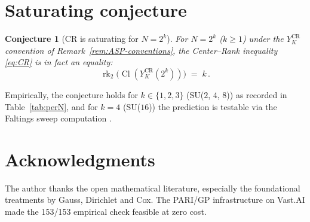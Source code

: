 \documentclass[11pt,a4paper,reqno]{amsart}
\newtheorem{conjecture}[theorem]{Conjecture}
\theoremstyle{definition}
\DeclareMathOperator{\Cl}{Cl}
\DeclareMathOperator{\rk}{rk}
\newcommand{\YKCR}{Y_K^{\mathrm{CR}}}
\begin{document}
\section{Saturating conjecture}\label{sec:conjecture}

\begin{conjecture}[CR is saturating for $N=2^k$]\label{conj:saturate}
For $N = 2^k$ ($k\ge 1$) under the $\YKCR$ convention of
Remark~\ref{rem:ASP-conventions}, the Center--Rank inequality \eqref{eq:CR}
is in fact an equality:
\[
  \rk_2\bigl(\Cl(\YKCR(2^k))\bigr) \;=\; k\,.
\]
\end{conjecture}

Empirically, the conjecture holds for $k\in\{1,2,3\}$ (SU($2$, $4$, $8$)) as
recorded in Table~\ref{tab:perN}, and for $k=4$ (SU($16$)) the prediction is
testable via the Faltings sweep computation
\cite{Remondiere2026Faltings}.

\section{Acknowledgments}\label{sec:acks}

The author thanks the open mathematical literature, especially the foundational treatments by Gauss, Dirichlet and Cox. The PARI/GP infrastructure on Vast.AI made the 153/153 empirical check feasible at zero cost.



\end{document}
